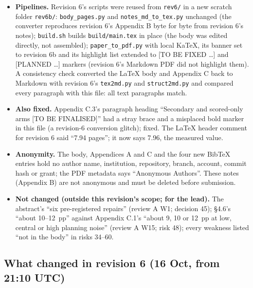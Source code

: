 \documentclass{article}
\theoremstyle{plain}
\theoremstyle{definition}
\theoremstyle{remark}
\begin{document}
\begin{itemize}
$$        Surveys); \texttt{olmo2025olmo3} (arXiv API, arXiv:2512.13961, ``Olmo
        3''; the model id allenai/Olmo-3-7B-Instruct, tagged arxiv:2512.13961,
        checked on the Hugging Face model API). The OpenReview API search record
        of Qi et al. (2025) was read for its abstract (prefilling attacks;
        deepening alignment).
  \item \textbf{Pipelines.} Revision 6's scripts were reused from
        \nolinkurl{rev6/} in a new scratch folder \nolinkurl{rev6b/}:
        \nolinkurl{body_pages.py} and \nolinkurl{notes_md_to_tex.py} unchanged
        (the converter reproduces revision 6's Appendix B byte for byte from
        revision 6's notes); \nolinkurl{build.sh} builds
        \nolinkurl{build/main.tex} in place (the body was edited directly, not
        assembled); \nolinkurl{paper_to_pdf.py} with local KaTeX, its banner set
        to revision 6b and its highlight list extended to [TO BE FIXED \ldots{}]
        and [PLANNED \ldots{}] markers (revision 6's Markdown PDF did not
        highlight them). A consistency check converted the LaTeX body and
        Appendix C back to Markdown with revision 6's \nolinkurl{tex2md.py} and
        \nolinkurl{struct2md.py} and compared every paragraph with this file:
        all text paragraphs match.
  \item \textbf{Also fixed.} Appendix C.3's paragraph heading ``Secondary and
        scored-only arms [TO BE FINALISED]'' had a stray brace and a misplaced
        bold marker in this file (a revision-6 conversion glitch); fixed. The
        LaTeX header comment for revision 6 said ``7.94 pages''; it now says
        7.96, the measured value.
  \item \textbf{Anonymity.} The body, Appendices A and C and the four new BibTeX
        entries hold no author name, institution, repository, branch, account,
        commit hash or grant; the PDF metadata says ``Anonymous Authors''. These
        notes (Appendix B) are not anonymous and must be deleted before
        submission.
  \item \textbf{Not changed (outside this revision's scope; for the lead).} The
        abstract's ``six pre-registered repairs'' (review A W1; decision 45);
        \S{}4.6's ``about 10--12~pp'' against Appendix C.1's ``about 9, 10 or
        12~pp at low, central or high planning noise'' (review A W15; risk 48);
        every weakness listed ``not in the body'' in risks 34--60.
\end{itemize}

\subsection{What changed in revision 6 (16 Oct, from 21:10 UTC)}
\end{document}

